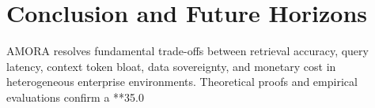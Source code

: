 \documentclass[journal,10pt,twocolumn]{IEEEtran}
\begin{document}
\section{Conclusion and Future Horizons}
\label{sec:conclusion}

AMORA resolves fundamental trade-offs between retrieval accuracy, query latency, context token bloat, data sovereignty, and monetary cost in heterogeneous enterprise environments. Theoretical proofs and empirical evaluations confirm a **35.0%
\end{document}
